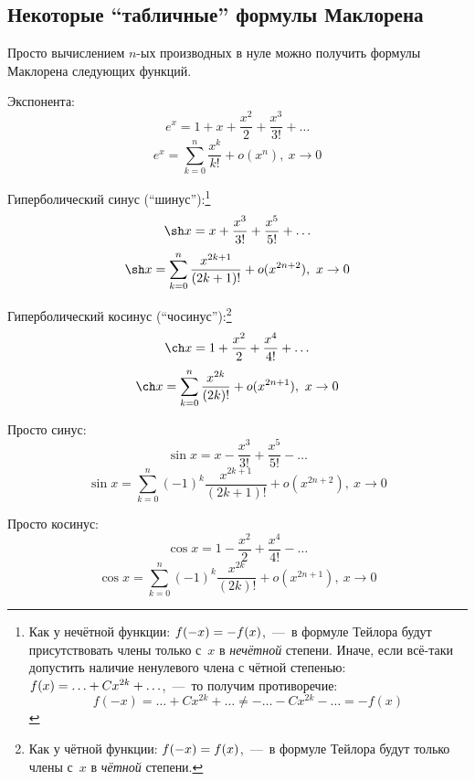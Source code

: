 \documentclass[a4paper,12pt]{article}
\begin{document}
  \subsection{Некоторые ``табличные'' формулы Маклорена}

  Просто вычислением $n$-ых производных в нуле можно получить формулы Маклорена следующих функций.

  Экспонента:
  \[
    e^x = 1 + x + \frac{x^2}{2} + \frac{x^3}{3!} + \ldots
  \]
  \begin{equation}\label{eq:exp}
    e^x = \sum_{k = 0}^n \frac{x^k}{k!} + o(x^n),\ x \to 0
  \end{equation}

  Гиперболический синус (``шинус''):\footnote{
    Как у нечётной функции: $f(-x) \hm= -f(x)$,~---~в формуле Тейлора будут присутствовать члены только с~$x$ в \emph{нечётной} степени.
    Иначе, если всё-таки допустить наличие ненулевого члена с чётной степенью: $f(x) \hm= \ldots \hm+ C x^{2k} \hm+ \ldots$,~---~то получим противоречие:
    \[
      f(-x) = \ldots + C x^{2k} + \ldots \not= -\ldots - C x^{2k} - \ldots = -f(x)
    \]
  }
  \[
    \sh x = x + \frac{x^3}{3!} + \frac{x^5}{5!} + \ldots
  \]
  \begin{equation}\label{eq:sh}
    \sh x = \sum_{k = 0}^n \frac{x^{2k + 1}}{(2k + 1)!} + o(x^{2n + 2}),\ x \to 0
  \end{equation}

  Гиперболический косинус (``чосинус''):\footnote{
    Как у чётной функции: $f(-x) \hm= f(x)$,~---~в формуле Тейлора будут только члены с~$x$ в \emph{чётной} степени.
  }
  \[
    \ch x = 1 + \frac{x^2}{2} + \frac{x^4}{4!} + \ldots
  \]
  \begin{equation}\label{eq:ch}
    \ch x = \sum_{k = 0}^n \frac{x^{2k}}{(2k)!} + o(x^{2n + 1}),\ x \to 0
  \end{equation}

  Просто синус:
  \[
    \sin x = x - \frac{x^3}{3!} + \frac{x^5}{5!} - \ldots
  \]
  \begin{equation}\label{eq:sin}
    \sin x = \sum_{k = 0}^n (-1)^{k} \frac{x^{2k + 1}}{(2k + 1)!} + o(x^{2n + 2}),\ x \to 0
  \end{equation}

  Просто косинус:
  \[
    \cos x = 1 - \frac{x^2}{2} + \frac{x^4}{4!} - \ldots
  \]
  \begin{equation}\label{eq:cos}
    \cos x = \sum_{k = 0}^n (-1)^k \frac{x^{2k}}{(2k)!} + o(x^{2n + 1}),\ x \to 0
  \end{equation}
\end{document}
